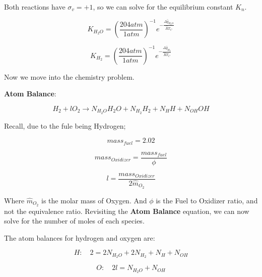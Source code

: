 \documentclass[12pt, Times New Roman]{article}
\begin{document}
    Both reactions have $\sigma_{v} = +1$, so we can solve for the equilibrium constant $K_{n}$.

    \begin{equation}
        K_{H_{2}O} = \left(\frac{204 atm}{1 atm}\right)^{-1} e^{-\frac{\Delta \hat{g}_{H_{2}O}}{\hat{R}T_{C}}}
    \end{equation}

    \begin{equation}
        K_{H_{2}} = \left(\frac{204 atm}{1 atm}\right)^{-1} e^{-\frac{\Delta \hat{g}_{H_{2}}}{\hat{R}T_{C}}}
    \end{equation}

    Now we move into the chemistry problem. 

    \textbf{Atom Balance}:

    \begin{equation}
        H_{2} + l O_{2} \rightarrow N_{H_{2}O} H_{2}O + N_{H_{2}} H_{2} + N_{H}H + N_{OH}OH
    \end{equation}

    Recall, due to the fule being Hydrogen;

    \begin{equation}
        mass_{fuel} = 2.02 
    \end{equation}

    \begin{equation}
        mass_{Oxidizer} =  \frac{mass_{fuel}}{\phi}
    \end{equation}

    \begin{equation}
        l = \frac{mass_{Oxidizer}}{2 \hat{m}_{O_{2}}}
    \end{equation}

    Where $\hat{m}_{O_{2}}$ is the molar mass of Oxygen. And $\phi$ is the Fuel to Oxidizer ratio, and not the equivalence ratio.
    Revisiting the \textbf{Atom Balance} equation, we can now solve for the number of moles of each species. 

    The atom balances for hydrogen and oxygen are:

    \begin{equation}
        H: \quad 2 = 2N_{H_{2}O} + 2N_{H_{2}} + N_{H} + N_{OH}
    \end{equation}

    \begin{equation}
        O: \quad 2l = N_{H_{2}O} + N_{OH}
    \end{equation}
\end{document}
